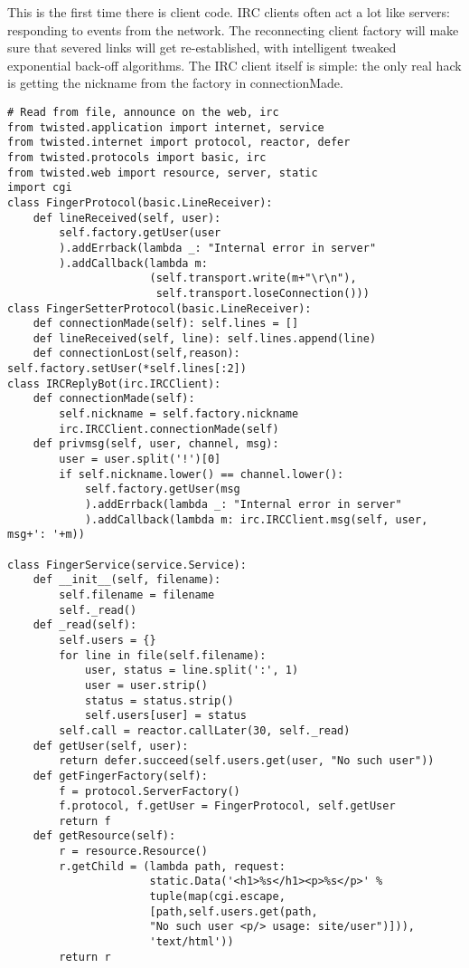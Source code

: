 This is the first time there is client code. IRC clients often act a lot like servers: responding to events from the network. The reconnecting client factory will make sure that severed links will get re-established, with intelligent tweaked exponential back-off algorithms. The IRC client itself is simple: the only real hack is getting the nickname from the factory in connectionMade.\begin{verbatim}
# Read from file, announce on the web, irc
from twisted.application import internet, service
from twisted.internet import protocol, reactor, defer
from twisted.protocols import basic, irc
from twisted.web import resource, server, static
import cgi
class FingerProtocol(basic.LineReceiver):
    def lineReceived(self, user):
        self.factory.getUser(user
        ).addErrback(lambda _: "Internal error in server"
        ).addCallback(lambda m:
                      (self.transport.write(m+"\r\n"),
                       self.transport.loseConnection()))
class FingerSetterProtocol(basic.LineReceiver):
    def connectionMade(self): self.lines = []
    def lineReceived(self, line): self.lines.append(line)
    def connectionLost(self,reason): self.factory.setUser(*self.lines[:2])
class IRCReplyBot(irc.IRCClient):
    def connectionMade(self):
        self.nickname = self.factory.nickname
        irc.IRCClient.connectionMade(self)
    def privmsg(self, user, channel, msg):
        user = user.split('!')[0]
        if self.nickname.lower() == channel.lower():
            self.factory.getUser(msg
            ).addErrback(lambda _: "Internal error in server"
            ).addCallback(lambda m: irc.IRCClient.msg(self, user, msg+': '+m))

class FingerService(service.Service):
    def __init__(self, filename):
        self.filename = filename
        self._read()
    def _read(self):
        self.users = {}
        for line in file(self.filename):
            user, status = line.split(':', 1)
            user = user.strip()
            status = status.strip()
            self.users[user] = status
        self.call = reactor.callLater(30, self._read)
    def getUser(self, user):
        return defer.succeed(self.users.get(user, "No such user"))
    def getFingerFactory(self):
        f = protocol.ServerFactory()
        f.protocol, f.getUser = FingerProtocol, self.getUser
        return f
    def getResource(self):
        r = resource.Resource()
        r.getChild = (lambda path, request:
                      static.Data('<h1>%s</h1><p>%s</p>' %
                      tuple(map(cgi.escape,
                      [path,self.users.get(path,
                      "No such user <p/> usage: site/user")])),
                      'text/html'))
        return r


\end{verbatim}

